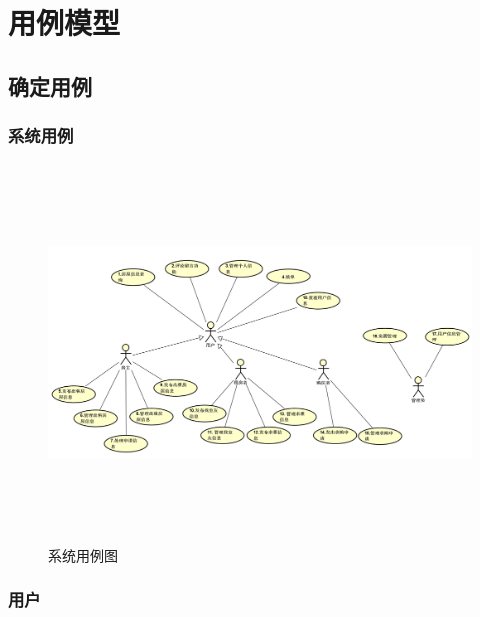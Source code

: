 
\chapter{用例模型}

\section{确定用例}

\subsection{系统用例}

\begin{figure}[htbp]

    \centering
    
    \includegraphics[height=10.0cm,width=14.0cm]{requirement/figures/xitong.png} 
    \caption{系统用例图}
    
    \end{figure}
\newpage
\subsection{用户}
 
